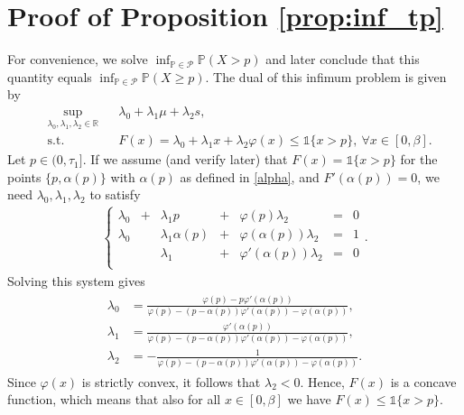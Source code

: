 \documentclass[11pt]{article}
\newcommand{\R}{\mathbb{R}}
\newcommand{\bP}{\mathbb{P}}
\newcommand{\cP}{\mathcal{P}}
\newcommand{\1}{\mathds{1}}
\begin{document}
\section{Proof of Proposition \ref{prop:inf_tp}}\label{ap:proof_pdproof2}
For convenience, we solve $\inf_{\bP \in \cP}\bP(X > p)$ and later conclude that this quantity equals $\inf_{\bP \in \cP}\bP(X \geq p)$. The dual of this infimum problem is given by
    \begin{equation}\label{dual2}
\begin{aligned}
&\sup_{\lambda_0,\lambda_1,\lambda_2 \in \R} &  &\lambda_0 + \lambda_1 \mu+\lambda_2 s,\\
&\text{s.t.} &      & F(x) = \lambda_0  +\lambda_1 x+\lambda_2 \varphi(x)  \leq \1{\{x > p\}}, \ \forall x\in[0,\beta]. 
\end{aligned}
\end{equation}
Let $p \in (0,\tau_1]$. If we assume (and verify later) that $F(x) = \1{\{x > p\}}$ for the points $\{p,\alpha(p)\}$ with $\alpha(p)$ as defined in \eqref{alpha}, and $F'(\alpha(p)) = 0$, we need $\lambda_0,\lambda_1,\lambda_2$ to satisfy 
\begin{align}
    \left\{
\begin{array}{rrrrrrr}
      \lambda_0 & + &\lambda_1 p  & + & \varphi(p) \lambda_2  &= & 0 \\
      \lambda_0 & & \lambda_1\alpha(p)  & + & \varphi(\alpha(p)) \lambda_2  &= & 1 \\
   & &\lambda_1  & + & \varphi'(\alpha(p)) \lambda_2  &= & 0 \\
\end{array}\right..
\label{eq:equations_dual2}
\end{align}
Solving this system gives
\begin{align}
\begin{array}{ll}
 \lambda_0 & = \displaystyle \frac{\varphi(p)-p\varphi'(\alpha(p))}{\varphi(p)-(p-\alpha(p))\varphi'(\alpha(p))-\varphi(\alpha(p))},\\[3.5ex] 
        \lambda_1 & = \displaystyle  \frac{\varphi'(\alpha(p))}{\varphi(p)-(p-\alpha(p))\varphi'(\alpha(p))-\varphi(\alpha(p))},  \\[3.5ex] 
        \lambda_2 & = \displaystyle  -\frac{1}{\varphi(p)-(p-\alpha(p))\varphi'(\alpha(p))-\varphi(\alpha(p))}.
\end{array}
\label{eq:dual_variables} 
\end{align}
Since $\varphi(x)$ is strictly convex, it follows that $\lambda_2 < 0$. Hence, $F(x)$ is a concave function, which means that also for all $x \in [0,\beta]$ we have $F(x) \leq \1\{x> p\}$.
\end{document}
